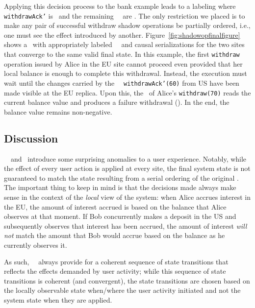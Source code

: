 Applying this decision process to the bank example leads to a 
labeling where {\tt withdrawAck'} is \red\ and the remaining
\shadow\ \operations\ are \blue. The only restriction we placed
is to make any pair of successful withdraw shadow operations
 be partially ordered, i.e., one must see
the effect introduced by another. Figure~\ref{fig:shadowopfinalfigure}
shows a \RBo\ with appropriately labeled \shadow\ \transactions\ and
causal serializations for the two sites that converge
to the same valid final state. In this example, the first {\tt withdraw} operation
issued by Alice in the EU site cannot proceed even provided that her local balance is enough
to complete this withdrawal. Instead, the execution must wait until the changes carried by the
\shadow\ \operation\ {\tt withdrawAck'(60)} from US have been made visible at the EU replica.
Upon this, the \initial\ of Alice's {\tt withdraw(70)} reads
the current balance value and produces a failure withdrawal (\blue). In the end,
the balance value remains non-negative.

\subsection{Discussion}
\label{sect:discussshadow}

\Shadow\ \operations\ and \RBCN\ introduce some surprising anomalies to a user
experience. Notably, while the effect of every user action is applied
at every site, the final system state is not guaranteed to match the
state resulting from a serial ordering of the original \operations.
The important thing to keep in mind is that the decisions made always
make sense in the context of the {\em local} view of the system: when
Alice accrues interest in the EU, the amount of interest accrued is
based on the balance that Alice observes at that moment.  If Bob
concurrently makes a deposit in the US and subsequently observes that
interest has been accrued, the amount of interest {\em will not} match
the amount that Bob would accrue based on the balance as he currently
observes it.

As such, \shadow\ \operations\ always provide for a coherent sequence of state
transitions that reflects the effects demanded by user activity; while
this sequence of state transitions is coherent (and convergent), the
state transitions are chosen based on the locally observable state
when/wh\-ere the user activity initiated and not the system state when
they are applied.


